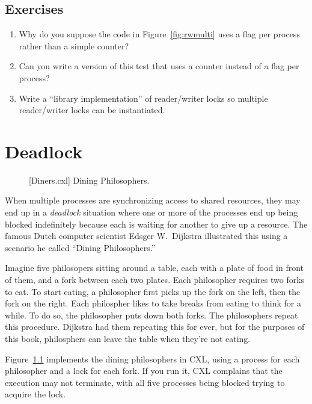 \documentclass{report}
\newenvironment{code}{
\tcolorbox
}{
\endtcolorbox
}
\begin{document}
\section*{Exercises}
\begin{enumerate}
\item Why do you suppose the code in Figure~\ref{fig:rwmulti} uses a flag
per process rather than a simple counter?
\item Can you write a version of this test that uses a counter instead
of a flag per process?
\item Write a ``library implementation'' of reader/writer locks so multiple
reader/writer locks can be instantiated.
\end{enumerate}

\chapter{Deadlock}
\label{ch:deadlock}

\begin{figure}
\begin{code}
\end{code}
\caption{[Diners.cxl] Dining Philosophers.}
\label{fig:diners}
\end{figure}

When multiple processes are synchronizing access to shared resources, they
may end up in a \emph{deadlock} situation where one or more of the processes
end up being blocked indefinitely because each is waiting for another to give
up a resource.
The famous Dutch computer scientist Edsger W.~Dijkstra illustrated this using
a scenario he called ``Dining Philosophers.''

Imagine five philosopers sitting around a table, each with a plate of food in
front of them, and a fork between each two plates.  Each philosopher requires
two forks to eat.  To start eating, a philosopher first picks up the fork on
the left, then the fork on the right.  Each philospher likes to take breaks
from eating to think for a while.  To do so, the philosopher puts down both
forks.  The philosophers repeat this procedure.  Dijkstra had them repeating
this for ever, but for the purposes of this book, philosphers can leave
the table when they're not eating.

Figure~\ref{fig:diners} implements the dining philosophers in CXL, using a
process for each philosopher and a lock for each fork.  If you
run it, CXL complains that the execution may not terminate, with all five
processes being blocked trying to acquire the lock.
\end{document}
